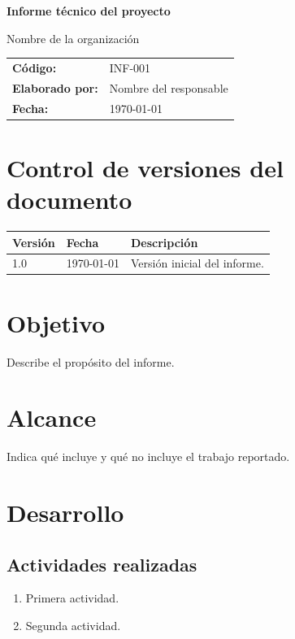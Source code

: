 \documentclass[11pt,a4paper]{article}
\newcommand{\organizacion}{Nombre de la organización}
\newcommand{\tituloinforme}{Informe técnico del proyecto}
\newcommand{\codigo}{INF-001}
\begin{document}
\begin{titlepage}
  \centering
  \vspace*{3cm}
  {\Huge\bfseries \tituloinforme\par}
  \vspace{1cm}
  {\Large \organizacion\par}
  \vspace{2cm}
  \begin{tabular}{ll}
    \textbf{Código:} & \codigo \\
    \textbf{Elaborado por:} & Nombre del responsable \\
    \textbf{Fecha:} & \today \\
  \end{tabular}
  \vfill
\end{titlepage}

\section*{Control de versiones del documento}
\begin{tabular}{llp{8cm}}
  \toprule
  Versión & Fecha & Descripción \\
  \midrule
  1.0 & \today & Versión inicial del informe. \\
  \bottomrule
\end{tabular}

\tableofcontents
\newpage

\section{Objetivo}
Describe el propósito del informe.

\section{Alcance}
Indica qué incluye y qué no incluye el trabajo reportado.

\section{Desarrollo}
\subsection{Actividades realizadas}
\begin{enumerate}
  \item Primera actividad.
  \item Segunda actividad.
\end{enumerate}
\end{document}
